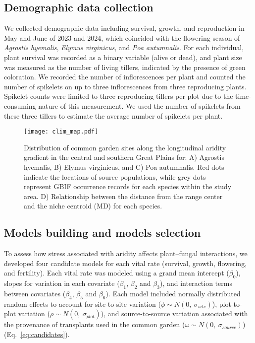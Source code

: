 \documentclass[12pt]{article}\usepackage[]{graphicx}\usepackage[dvipsnames]{xcolor}
\begin{document}
\subsection*{Demographic data collection}
We collected demographic data including survival, growth, and reproduction in May and June of 2023 and 2024, which coincided with the flowering season of \emph{Agrostis hyemalis}, \emph{Elymus virginicus}, and \emph{Poa autumnalis}. 
For each individual, plant survival was recorded as a binary variable (alive or dead), and plant size was measured as the number of living tillers, indicated by the presence of green coloration.  
We recorded the number of inflorescences per plant and counted the number of spikelets on up to three inflorescences from three reproducing plants.  
Spikelet counts were limited to three reproducing tillers per plot due to the time-consuming nature of this measurement.  
We used the number of spikelets from these three tillers to estimate the average number of spikelets per plant.

\begin{figure}[H]
\centering
\texttt{[image: clim\_map.pdf]}
\caption{Distribution of common garden sites along the longitudinal aridity gradient in the central and southern Great Plains for: A) Agrostis hyemalis, B) Elymus virginicus, and C) Poa autumnalis. Red dots indicate the locations of source populations, while grey dots represent GBIF occurrence records for each species within the study area. D) Relationship between the distance from the range center and the niche centroid (MD) for each species.}
\label{fig:site}
\end{figure}


\subsection*{Models building and models selection}
To assess how stress associated with aridity affects plant–fungal  interactions, we developed four candidate models for each vital rate (survival, growth, flowering, and fertility).  
Each vital rate was modeled using a grand mean intercept ($\beta_{0}$), slopes for variation in each covariate ($\beta_{1}$, $\beta_{2}$ and $\beta_{3}$), and interaction terms between covariates ($\beta_{4}$, $\beta_{5}$ and $\beta_{6}$).  
Each model included normally distributed random effects to account for site-to-site variation ($\phi \sim N(0,\ \sigma_{site})$), plot-to-plot variation ($\rho \sim N(0,\ \sigma_{plot})$), and source-to-source variation associated with the provenance of transplants used in the common garden ($\omega \sim N(0,\ \sigma_{source})$) (Eq.~\ref{eq:candidates}).
\end{document}
